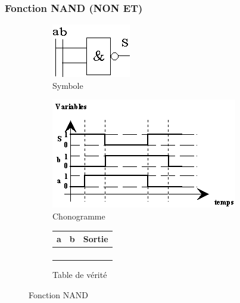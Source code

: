 \documentclass[10pt,fleqn]{article} %
\begin{document}
\subsubsection{Fonction NAND (NON ET)}
\begin{figure}[ht]
  \begin{subfigure}{.2\textwidth}
    \includegraphics[width=\textwidth]{images/nand_symb}
    \caption{Symbole}
    \centering
  \end{subfigure}
  \begin{subfigure}{.4\textwidth}
    \centering
    \includegraphics[width=\textwidth]{images/nand_chrono}
    \caption{Chonogramme}
  \end{subfigure}
  \begin{subfigure}{.33\textwidth}
    \centering
    \begin{tabular}{|c|c|c|}
      \hline
      \textbf{a}&  \textbf{b}& \textbf{Sortie} \\
      \hline
       & & \\ \hline
       & & \\ \hline
       & & \\ \hline
       & & \\ \hline
    \end{tabular}
    \caption{Table de vérité}
  \end{subfigure}
  \caption{Fonction NAND}
\end{figure}
\pagebreak
\end{document}
